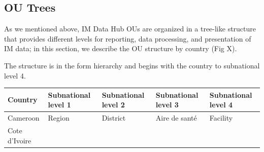 \documentclass[]{book}
\begin{document}
\hypertarget{ou-trees}{%
\subsection{OU Trees}\label{ou-trees}}

As we mentioned above, IM Data Hub OUs are organized in a tree-like structure that provides different levels for reporting, data processing, and presentation of IM data; in this section, we describe the OU structure by country (Fig X).

The structure is in the form hierarchy and begins with the country to subnational level 4.

\begin{longtable}[]{@{}lllll@{}}
\toprule
\begin{minipage}[b]{0.07\columnwidth}\raggedright
Country\strut
\end{minipage} & \begin{minipage}[b]{0.20\columnwidth}\raggedright
Subnational level 1\strut
\end{minipage} & \begin{minipage}[b]{0.20\columnwidth}\raggedright
Subnational level 2\strut
\end{minipage} & \begin{minipage}[b]{0.20\columnwidth}\raggedright
Subnational level 3\strut
\end{minipage} & \begin{minipage}[b]{0.20\columnwidth}\raggedright
Subnational level 4\strut
\end{minipage}\tabularnewline
\midrule
\endhead
\begin{minipage}[t]{0.07\columnwidth}\raggedright
Cameroon\strut
\end{minipage} & \begin{minipage}[t]{0.20\columnwidth}\raggedright
Region\strut
\end{minipage} & \begin{minipage}[t]{0.20\columnwidth}\raggedright
District\strut
\end{minipage} & \begin{minipage}[t]{0.20\columnwidth}\raggedright
Aire de santé\strut
\end{minipage} & \begin{minipage}[t]{0.20\columnwidth}\raggedright
Facility\strut
\end{minipage}\tabularnewline
\begin{minipage}[t]{0.07\columnwidth}\raggedright
Cote d'Ivoire\strut
\end{minipage} & \begin{minipage}[t]{0.20\columnwidth}\raggedright

\end{minipage}
\end{longtable}
\end{document}
